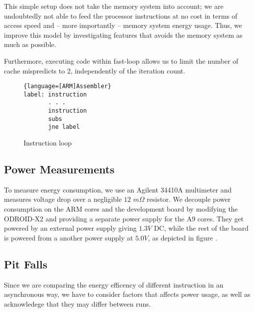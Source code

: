 This simple setup does not take the memory system into account; we are
undoubtedly not able to feed the processor instructions at no cost in terms of
access speed and -- more importantly -- memory system energy usage. Thus, we
improve this model by investigating features that avoids the memory system as
much as possible.

Furthermore, executing code within fast-loop allows us to limit the number of
cache mispredicts to 2, independently of the iteration count.

\begin{figure}
\begin{lstlisting}{language=[ARM]Assembler}
label: instruction
       . . .
       instruction
       subs
       jne label
\end{lstlisting}
\caption{Instruction loop}
\label{list:inst_loop}
\end{figure}

\subsection{Power Measurements}
To measure energy consumption, we use an Agilent 34410A multimeter and measures
voltage drop over a negligible $12$ $m\Omega$ resistor. We decouple power
consumption on the ARM cores and the development board by modifying the
ODROID-X2 and providing a separate power supply for the A9 cores. They get
powered by an external power supply giving $1.3V$ DC, while the rest of the
board is powered from a another power supply at $5.0V$, as depicted in figure
.

\subsection{Pit Falls}
Since we are comparing the energy efficency of different instruction in an asynchronous
way, we have to consider factors that affects power usage, as well as acknowledege that
they may differ between runs.

